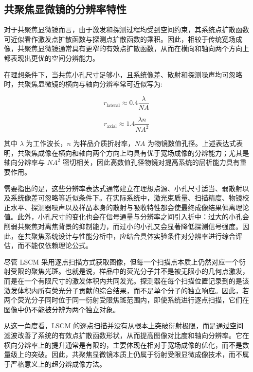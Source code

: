\subsection{共聚焦显微镜的分辨率特性}\label{3.1.3}
对于共聚焦显微镜而言，由于激发和探测过程均受到空间约束，其系统点扩散函数可近似看作激发点扩散函数与探测点扩散函数的乘积。因此，相较于传统宽场成像，共聚焦显微镜通常具有更窄的有效点扩散函数，从而在横向和轴向两个方向上都表现出更优的空间分辨能力。

在理想条件下，当共焦小孔尺寸足够小，且系统像差、散射和探测噪声均可忽略时，共聚焦显微镜的横向与轴向分辨率常可近似写为:

\begin{equation}
r_{\mathrm{lateral}}\approx 0.4\frac{\lambda}{NA}
\end{equation}

\begin{equation}
r_{\mathrm{axial}}\approx 1.4\frac{\lambda n}{NA^2}
\end{equation}

其中 $\lambda$ 为工作波长，$n$ 为样品介质折射率，$NA$ 为物镜数值孔径。上述表达式表明，共聚焦成像在横向和轴向两个方向上均具有优于宽场成像的分辨能力；尤其是轴向分辨率与 $NA^2$ 密切相关，因此高数值孔径物镜对提高系统的层析能力具有重要作用。

需要指出的是，这些分辨率表达式通常建立在理想点源、小孔尺寸适当、弱散射以及系统像差可忽略等近似条件下。在实际系统中，激光束质量、扫描精度、物镜校正水平、探测器噪声以及样品本身的散射与吸收特性都会使最终成像结果偏离理论值。此外，小孔尺寸的变化也会在信号通量与分辨率之间引入折中：过大的小孔会削弱共聚焦对离焦背景的抑制能力，而过小的小孔又会显著降低探测信号强度。因此，在共聚焦系统设计与性能分析中，应结合具体实验条件对分辨率进行综合评估，而不能仅依赖理论公式。

尽管 LSCM 采用逐点扫描方式获取图像，但每一个扫描点本质上仍然对应一个衍射受限的聚焦光斑。也就是说，样品中的荧光分子并不是被无限小的几何点激发，而是在一个有限尺寸的激发体积内共同发光。探测器在每个扫描位置记录到的是该激发体积内所有荧光分子贡献的综合结果，而不是单个分子的独立响应。因此，若两个荧光分子同时位于同一衍射受限焦斑范围内，即使系统进行逐点扫描，它们在图像中仍不能被分辨为两个独立对象。

从这一角度看，LSCM 的逐点扫描并没有从根本上突破衍射极限，而是通过空间滤波改善了系统的有效点扩散函数形状，从而提高图像对比度和轴向分辨率。它在横向分辨率上的提升通常是有限的，主要体现在相对于宽场成像的优化，而不是数量级上的突破。因此，共聚焦显微镜本质上仍属于衍射受限显微成像技术，而不属于严格意义上的超分辨成像方法。



